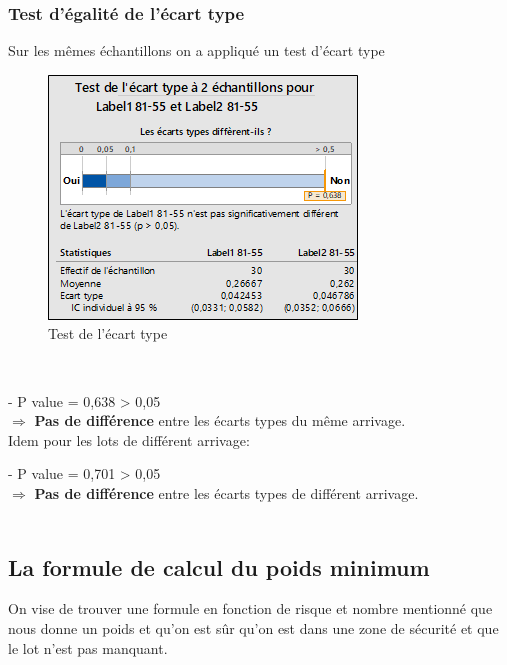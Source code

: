 \documentclass[12pt, a4paper]{thesis}
\begin{document}
\subsubsection{Test d'égalité de l'écart type}
Sur les mêmes échantillons on a appliqué un test d'écart type
\begin{figure}[!h]
\begin{center}
\includegraphics[scale=1]{ecaart.png}
\caption{Test de l'écart type}
\end{center}
\end{figure}\\
\item - P value = 0,638 > 0,05\\
$\Longrightarrow$ \textbf{Pas de différence} entre les écarts types du même arrivage.\\
Idem pour les lots de différent arrivage:

\item - P value = 0,701 > 0,05\\
$\Longrightarrow$ \textbf{Pas de différence} entre les écarts types de différent arrivage. \\


\\





\subsection{La formule de calcul du poids minimum}

On vise de trouver une formule en fonction de risque et nombre mentionné que nous donne un poids et qu'on est sûr qu'on est dans une zone de sécurité et que le lot n'est pas manquant.
\end{document}
